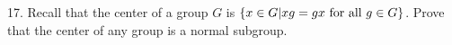 \newpage
\begin{mdframed}[style=darkQuesion]
17. Recall that the center of a group $G$ is 
$\left\{x\in G\vert xg=gx \text{ for all }g\in G\right\}$. 
Prove that the center of any group is a normal subgroup. 
\end{mdframed}
\begin{mdframed}[style=darkAnswer,frametitle={Joe Starr}]
\end{mdframed}
\newpage